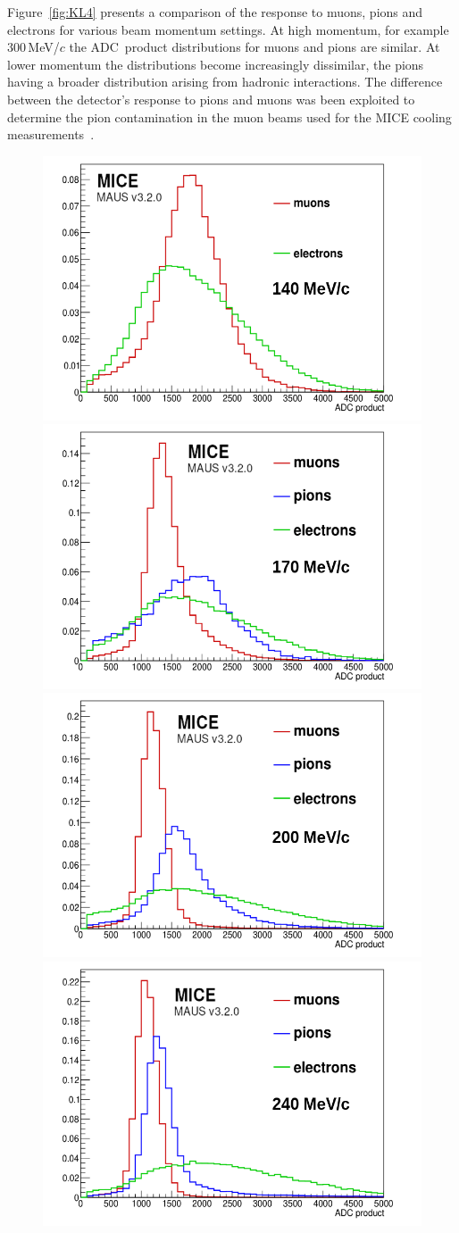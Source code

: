 Figure~\ref{fig:KL4} presents a comparison of the response to muons,
pions and electrons for various beam momentum settings.
At high momentum, for example 300\,MeV/$c$ the ADC~product
distributions for muons and pions are similar.
At lower momentum the distributions become increasingly dissimilar,
the pions having a broader distribution arising from hadronic
interactions.
The difference between the detector's response to pions and muons was
been exploited to determine the pion contamination in the muon beams
used for the MICE cooling measurements~\cite{2016JInst..11P3001A}.  
\begin{figure}
  \begin{center}
    \includegraphics[width=0.45\columnwidth]{./04-KL/Figures/mu_vs_e_140MEV-edited.png}
    \includegraphics[width=0.45\columnwidth]{./04-KL/Figures/mu_vs_pi_vs_e_170MEV-edited.png} 
    \includegraphics[width=0.45\columnwidth]{./04-KL/Figures/mu_vs_pi_vs_e_200MEV-edited.png}
    \includegraphics[width=0.45\columnwidth]{./04-KL/Figures/mu_vs_pi_vs_e_240MEV-edited.png}  	

\end{center}
\end{figure}
